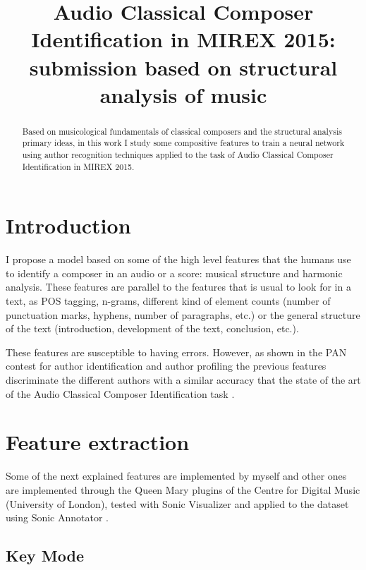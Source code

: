 \documentclass{article}
\title{Audio Classical Composer Identification in MIREX 2015: submission based on structural analysis of music}
\begin{document}
%
\maketitle
%
\begin{abstract}
Based on musicological fundamentals of classical composers and the structural analysis primary ideas, in this work I study some compositive features to train a neural network using author recognition techniques applied to the task of Audio Classical Composer Identification in MIREX 2015. 
\end{abstract}
%


\section{Introduction}\label{sec:introduction}

I propose a model based on some of the high level features that the humans use to identify a composer in an audio or a score: musical structure and harmonic analysis.  These features are parallel to the features that is usual to look for in a text, as POS tagging, n-grams, different kind of element counts (number of punctuation marks, hyphens, number of paragraphs, etc.) or the general structure of the text (introduction, development of the text, conclusion, etc.).

These features are susceptible to having errors. However, as shown in the PAN contest for author identification \cite{pan14id} and author profiling \cite{pan13pr} the previous features discriminate the different authors with a similar accuracy that the state of the art of the Audio Classical Composer Identification task \cite{mirex14res}.



\section{Feature extraction}\label{sec:feature_extraction}

Some of the next explained features are implemented by myself and other ones are implemented through the Queen Mary plugins of the Centre for Digital Music (University of London), tested with Sonic Visualizer \cite{sonic_visualizer} and applied to the dataset using Sonic Annotator \cite{sonic_annotator}.

\subsection{Key Mode}\label{subsec:keymode}
\end{document}
